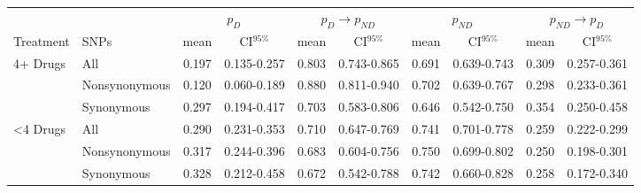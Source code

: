 \documentclass[12pt, oneside]{article}   	%
\begin{document}
\begin{table}
   \centering
   \begin{tabular}{@{} llcccccccc @{}} %
      \toprule
      & & \multicolumn{2}{c}{$p_D$} & \multicolumn{2}{c}{$p_D\rightarrow{}p_{ND}$} & \multicolumn{2}{c}{$p_{ND}$} & \multicolumn{2}{c}{$p_{ND}\rightarrow{}p_{D}$} \\
      \cmidrule(l){3-4} \cmidrule(l){5-6} \cmidrule(l){7-8}  \cmidrule(l){9-10}
      \cmidrule(l){2-8} %
      Treatment & SNPs & mean & CI$^{95\%}$ & mean & CI$^{95\%}$ & mean & CI$^{95\%}$ & mean & CI$^{95\%}$ \\
      \midrule
      4+ Drugs & All & 0.197 & 0.135-0.257 & 0.803 & 0.743-0.865 & 0.691 & 0.639-0.743 & 0.309 & 0.257-0.361 \\
       & Nonsynonymous & 0.120 & 0.060-0.189 & 0.880 & 0.811-0.940 & 0.702 & 0.639-0.767 & 0.298 & 0.233-0.361 \\
       & Synonymous & 0.297 & 0.194-0.417 & 0.703 & 0.583-0.806 & 0.646 & 0.542-0.750 & 0.354 & 0.250-0.458 \\
      <4 Drugs & All & 0.290 & 0.231-0.353 & 0.710 & 0.647-0.769 & 0.741 & 0.701-0.778 & 0.259 & 0.222-0.299 \\
       & Nonsynonymous & 0.317 & 0.244-0.396 & 0.683 & 0.604-0.756 & 0.750 & 0.699-0.802 & 0.250 & 0.198-0.301 \\
       & Synonymous & 0.328 & 0.212-0.458 & 0.672 & 0.542-0.788 & 0.742 & 0.660-0.828 & 0.258 & 0.172-0.340 \\
      \bottomrule
   \end{tabular}
  \label{tab:MC}
\end{table}
\end{document}
